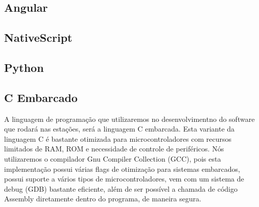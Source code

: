 	\subsection{Angular}

	\subsection{NativeScript}

	\subsection{Python}

    \subsection{C Embarcado}
    A linguagem de programação que utilizaremos no desenvolvimentno do software que rodará
    nas estações, será a linguagem C embarcada. Esta variante da linguagem C é bastante otimizada
    para microcontroladores com recursos limitados de RAM, ROM e necessidade de controle de periféricos.
    Nós utilizaremos o compilador Gnu Compiler Collection (GCC), pois esta implementação possui várias flags
    de otimização para sistemas embarcados, possui suporte a vários tipos de microcontroladores, vem com
    um sistema de debug (GDB) bastante eficiente, além de ser possível a chamada de código Assembly diretamente
    dentro do programa, de maneira segura.